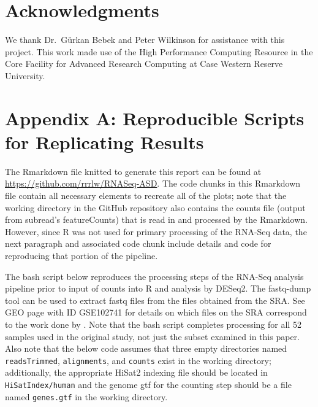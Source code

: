 \section{Acknowledgments}\label{acknowledgments}

We thank Dr.~Gürkan Bebek and Peter Wilkinson for assistance with this
project. This work made use of the High Performance Computing Resource
in the Core Facility for Advanced Research Computing at Case Western
Reserve University.

\pagebreak


\pagebreak
\appendix
\section{Appendix A: Reproducible Scripts for Replicating Results}
\label{appen:hpc-code}

The Rmarkdown file knitted to generate this report can be found at
\url{https://github.com/rrrlw/RNASeq-ASD}. The code chunks in this
Rmarkdown file contain all necessary elements to recreate all of the
plots; note that the working directory in the GitHub repository also
contains the counts file (output from subread's featureCounts) that is
read in and processed by the Rmarkdown. However, since R was not used
for primary processing of the RNA-Seq data, the next paragraph and
associated code chunk include details and code for reproducing that
portion of the pipeline.

The bash script below reproduces the processing steps of the RNA-Seq
analysis pipeline prior to input of counts into R and analysis by
DESeq2. The fastq-dump tool can be used to extract fastq files from the
files obtained from the SRA. See GEO page with ID GSE102741 for details
on which files on the SRA correspond to the work done by
\citet{orig-paper}. Note that the bash script completes processing for
all 52 samples used in the original study, not just the subset examined
in this paper. Also note that the below code assumes that three empty
directories named \texttt{readsTrimmed}, \texttt{alignments}, and
\texttt{counts} exist in the working directory; additionally, the
appropriate HiSat2 indexing file should be located in
\texttt{HiSatIndex/human} and the genome gtf for the counting step
should be a file named \texttt{genes.gtf} in the working directory.

